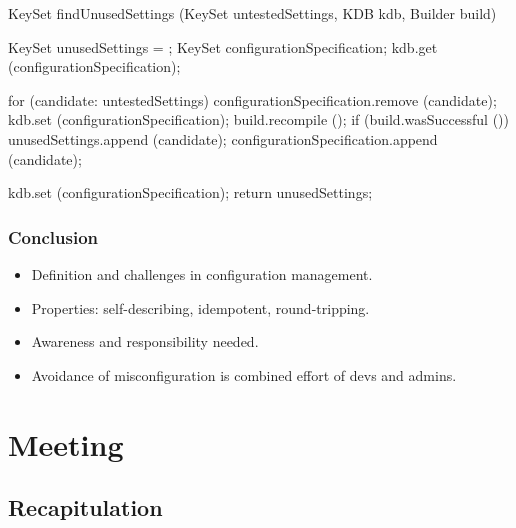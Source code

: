\begin{frame}[fragile]
	\small
	\fontsize{10}{0}\selectfont
	\begin{code}[gobble=4,language=Cpp]
	KeySet findUnusedSettings (KeySet untestedSettings,
				   KDB kdb,
				   Builder build)
	{
	   KeySet unusedSettings = {};
	   KeySet configurationSpecification;
	   kdb.get (configurationSpecification);

	   for (candidate: untestedSettings)
	   {
	       configurationSpecification.remove (candidate);
	       kdb.set (configurationSpecification);
	       build.recompile ();
	       if (build.wasSuccessful ())
	       {
	          unusedSettings.append (candidate);
	       }
	       configurationSpecification.append (candidate);
	   }

	   kdb.set (configurationSpecification);
	   return unusedSettings;
	}
	\end{code}
\end{frame}

\begin{frame}
	\frametitle{Conclusion}

	\begin{itemize}[<+-| alert@+>]
	\item Definition and challenges in configuration management.
	\item Properties: self-describing, idempotent, round-tripping.
	\item Awareness and responsibility needed.
	\item Avoidance of misconfiguration is combined effort of devs and admins.
	\end{itemize}
\end{frame}


\section{Meeting}

\subsection{Recapitulation}


